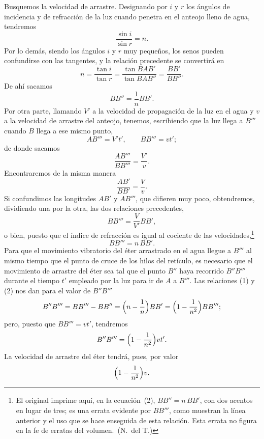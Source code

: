 Busquemos la velocidad de arrastre. Designando por $i$ y $r$ los ángulos de
incidencia y de refracción de la luz cuando penetra en el anteojo lleno de
agua, tendremos
\[
\frac{\sin i}{\sin r} = n.
\]
Por lo demás, siendo los ángulos $i$ y $r$ muy pequeños, los senos pueden
confundirse con las tangentes, y la relación precedente se convertirá en
\[
n = \frac{\tan i}{\tan r} = \frac{\tan BAB'}{\tan BAB''} = \frac{BB'}{BB''}.
\]
De ahí sacamos
\begin{equation}
BB'' = \frac{1}{n}BB'.
\end{equation}
Por otra parte, llamando $V'$ a la velocidad de propagación de la luz en el
agua y $v$ a la velocidad de arrastre del anteojo, tenemos, escribiendo que
la luz llega a $B'''$ cuando $B$ llega a ese mismo punto,
\[
AB''' = V't', \qquad BB''' = vt';
\]
de donde sacamos
\[
\frac{AB'''}{BB'''} = \frac{V'}{v}.
\]
Encontraremos de la misma manera
\[
\frac{AB'}{BB'} = \frac{V}{v}.
\]
Si confundimos las longitudes $AB'$ y $AB'''$, que difieren muy poco,
obtendremos, dividiendo una por la otra, las dos relaciones precedentes,
\[
BB''' = \frac{V}{V'}BB',
\]
o bien, puesto que el índice de refracción es igual al cociente de las
velocidades,\footnote{El original imprime aquí, en la
ecuación~(2), $BB'' = n\,BB'$, con dos acentos en lugar de tres; es una errata
evidente por $BB'''$, como muestran la línea anterior y el uso que se hace
enseguida de esta relación. Esta errata no figura en la fe de erratas del volumen.~(N.~del T.)}
\begin{equation}
BB''' = n\,BB'.
\end{equation}
Para que el movimiento vibratorio del éter arrastrado en el agua llegue a
$B'''$ al mismo tiempo que el punto de cruce de los hilos del retículo, es
necesario que el movimiento de arrastre del éter sea tal que el punto
$B''$ haya recorrido $B''B'''$ durante el tiempo $t'$ empleado por la luz
para ir de $A$ a $B'''$. Las relaciones (1) y (2) nos dan para el valor de
$B''B'''$
\[
B''B''' = BB''' - BB'' = \Bigl(n-\frac{1}{n}\Bigr)BB' =
\Bigl(1-\frac{1}{n^2}\Bigr)BB''';
\]
pero, puesto que $BB'''=vt'$, tendremos
\[
B''B''' = \Bigl(1-\frac{1}{n^2}\Bigr)vt'.
\]
La velocidad de arrastre del éter tendrá, pues, por valor
\[
\Bigl(1-\frac{1}{n^2}\Bigr)v.
\]

